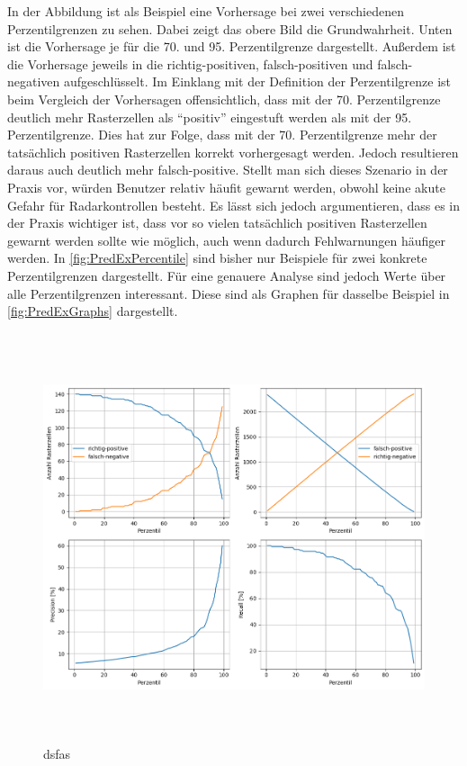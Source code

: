 In der Abbildung ist als Beispiel eine Vorhersage bei zwei verschiedenen Perzentilgrenzen zu sehen.
Dabei zeigt das obere Bild die Grundwahrheit.
Unten ist die Vorhersage je für die 70. und 95. Perzentilgrenze dargestellt.
Außerdem ist die Vorhersage jeweils in die richtig-positiven, falsch-positiven und falsch-negativen aufgeschlüsselt.
Im Einklang mit der Definition der Perzentilgrenze ist beim Vergleich der Vorhersagen offensichtlich, dass mit der 70. Perzentilgrenze deutlich mehr Rasterzellen als "`positiv"' eingestuft werden als mit der 95. Perzentilgrenze.
Dies hat zur Folge, dass mit der 70. Perzentilgrenze mehr der tatsächlich positiven Rasterzellen korrekt vorhergesagt werden.
Jedoch resultieren daraus auch deutlich mehr falsch-positive.
Stellt man sich dieses Szenario in der Praxis vor, würden Benutzer relativ häufit gewarnt werden, obwohl keine akute Gefahr für Radarkontrollen besteht.
Es lässt sich jedoch argumentieren, dass es in der Praxis wichtiger ist, dass vor so vielen tatsächlich positiven Rasterzellen gewarnt werden sollte wie möglich, auch wenn dadurch Fehlwarnungen häufiger werden.
In \autoref{fig:PredExPercentile} sind bisher nur Beispiele für zwei konkrete Perzentilgrenzen dargestellt.
Für eine genauere Analyse sind jedoch Werte über alle Perzentilgrenzen interessant.
Diese sind als Graphen für dasselbe Beispiel in \autoref{fig:PredExGraphs} dargestellt.

\begin{figure}[h]
    \centering
    \includegraphics[width=1.0\textwidth,height=12cm,keepaspectratio=true]{content/images/PredExGraphs.png}
    \caption{dsfas}
    \label{fig:PredExGraphs}
\end{figure}

